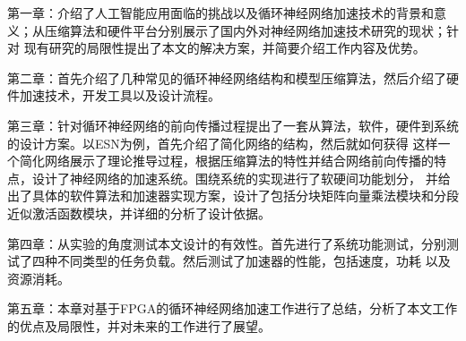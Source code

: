 第一章：介绍了人工智能应用面临的挑战以及循环神经网络加速技术的背景和意义；从压缩算法和硬件平台分别展示了国内外对神经网络加速技术研究的现状；针对
现有研究的局限性提出了本文的解决方案，并简要介绍工作内容及优势。

第二章：首先介绍了几种常见的循环神经网络结构和模型压缩算法，然后介绍了硬件加速技术，开发工具以及设计流程。

第三章：针对循环神经网络的前向传播过程提出了一套从算法，软件，硬件到系统的设计方案。以ESN为例，首先介绍了简化网络的结构，然后就如何获得
这样一个简化网络展示了理论推导过程，根据压缩算法的特性并结合网络前向传播的特点，设计了神经网络的加速系统。围绕系统的实现进行了软硬间功能划分，
并给出了具体的软件算法和加速器实现方案，设计了包括分块矩阵向量乘法模块和分段近似激活函数模块，并详细的分析了设计依据。

第四章：从实验的角度测试本文设计的有效性。首先进行了系统功能测试，分别测试了四种不同类型的任务负载。然后测试了加速器的性能，包括速度，功耗
以及资源消耗。

第五章：本章对基于FPGA的循环神经网络加速工作进行了总结，分析了本文工作的优点及局限性，并对未来的工作进行了展望。

%
%
%
%
%
%
%
%
%
%
%
%
%




